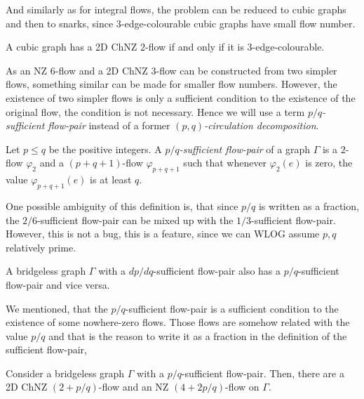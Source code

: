 And similarly as for integral flows, the problem can be reduced to cubic graphs and then to snarks, since $3$-edge-colourable cubic graphs have small flow number.

\begin{theorem} \emph{\cite[p. 343]{svk}}
    A cubic graph has a 2D ChNZ $2$-flow if and only if it is $3$-edge-colourable.\label{th:2_chnzf_iff_3_col}
\end{theorem}

As an NZ $6$-flow and a 2D ChNZ $3$-flow can be constructed from two simpler flows, something similar can be made for smaller flow numbers. However, the existence of two simpler flows is only a sufficient condition to the existence of the original flow, the condition is not necessary. Hence we will use a term \emph{$p/q$-sufficient flow-pair} instead of a former \emph{$(p,q)$-circulation decomposition}.

\begin{definition}
        Let $p\leq q$ be the positive integers. A \emph{$p/q$-sufficient flow-pair} of a graph $\Gamma$ is a $2$-flow $\varphi_2$ and a $(p+q+1)$-flow $\varphi_{p+q+1}$ such that whenever $\varphi_2(e)$ is zero, the value $\varphi_{p+q+1}(e)$ is at least $q$.
\end{definition}

One possible ambiguity of this definition is, that since $p/q$ is written as a fraction, the $2/6$-sufficient flow-pair can be mixed up with the $1/3$-sufficient flow-pair. However, this is not a bug, this is a feature, since we can WLOG assume $p,q$ relatively prime.

\begin{lemma}
A bridgeless graph $\Gamma$ with a $dp/dq$-sufficient flow-pair also has a $p/q$-sufficient flow-pair and vice versa.
\end{lemma}

We mentioned, that the $p/q$-sufficient flow-pair is a sufficient condition to the existence of some nowhere-zero flows. Those flows are somehow related with the value $p/q$ and that is the reason to write it as a fraction in the definition of the sufficient flow-pair,

\begin{proposition} \emph{\cite[p. 344]{svk}}
    Consider a bridgeless graph $\Gamma$ with a $p/q$-sufficient flow-pair. Then, there are a 2D ChNZ $(2+p/q)$-flow and an NZ $(4+2p/q)$-flow on $\Gamma$.\label{prop:nzf_from_sufficient_flow_pair}
\end{proposition}

